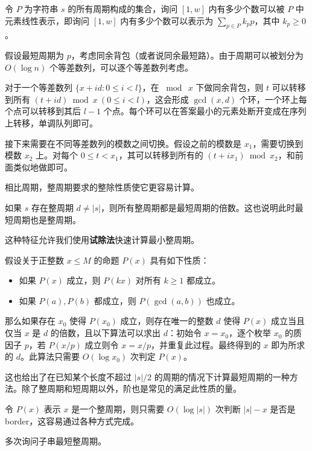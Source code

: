 \begin{exercise}[P4156]
    令 $P$ 为字符串 $s$ 的所有周期构成的集合，询问 $[1,w]$ 内有多少个数可以被 $P$ 中元素线性表示，即询问 $[1,w]$ 内有多少个数可以表示为 $\sum_{p\in P} k_p p$，其中 $k_p\ge 0$。
\end{exercise}
\begin{solution}
    假设最短周期为 $p$，考虑同余背包（或者说同余最短路）。由于周期可以被划分为 $O(\log n)$ 个等差数列，可以逐个等差数列考虑。
    
    对于一个等差数列 $\{x+id:0\le i<l\}$，在 $\bmod\ x$ 下做同余背包，则 $t$ 可以转移到所有 $(t+id)\bmod x\ (0\le i<l)$，这会形成 $\gcd(x,d)$ 个环，一个环上每个点可以转移到其后 $l-1$ 个点。每个环可以在答案最小的元素处断开变成在序列上转移，单调队列即可。

    接下来需要在不同等差数列的模数之间切换。假设之前的模数是 $x_1$，需要切换到模数 $x_2$ 上。对每个 $0\le t<x_1$，其可以转移到所有的 $(t+ix_1)\bmod x_2$，和前面类似地做即可。
\end{solution}

相比周期，整周期要求的整除性质使它更容易计算。
\begin{lemma}
    如果 $s$ 存在整周期 $d\ne |s|$，则所有整周期都是最短周期的倍数。这也说明此时最短周期也是整周期。
\end{lemma}
这种特征允许我们使用\textbf{试除法}快速计算最小整周期。
\begin{lemma}
    假设关于正整数 $x\le M$ 的命题 $P(x)$ 具有如下性质：
    \begin{itemize}
        \item 如果 $P(x)$ 成立，则 $P(kx)$ 对所有 $k\ge 1$ 都成立。
        \item 如果 $P(a),P(b)$ 都成立，则 $P(\gcd(a,b))$ 也成立。
    \end{itemize}
    那么如果存在 $x_0$ 使得 $P(x_0)$ 成立，则存在唯一的整数 $d$ 使得 $P(x)$ 成立当且仅当 $x$ 是 $d$ 的倍数，且以下算法可以求出 $d$：初始令 $x=x_0$，逐个枚举 $x_0$ 的质因子 $p$，若 $P(x/p)$ 成立则令 $x=x/p$，并重复此过程。最终得到的 $x$ 即为所求的 $d$。此算法只需要 $O(\log x_0)$ 次判定 $P(x)$。
\end{lemma}
\begin{remark}
    这也给出了在已知某个长度不超过 $|s|/2$ 的周期的情况下计算最短周期的一种方法。除了整周期和短周期以外，阶也是常见的满足此性质的量。
\end{remark}
令 $P(x)$ 表示 $x$ 是一个整周期，则只需要 $O(\log |s|)$ 次判断 $|s|-x$ 是否是 border，这容易通过各种方式完成。
\begin{exercise}[P3538]
    多次询问子串最短整周期。
\end{exercise}




